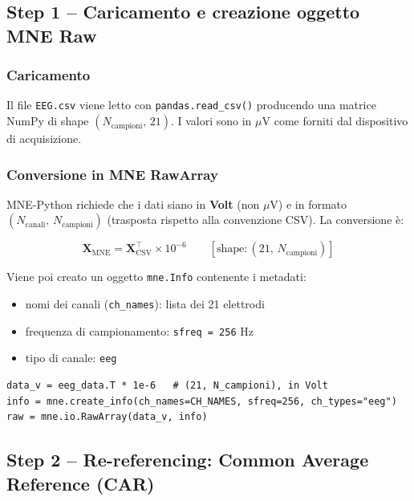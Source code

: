 \documentclass[12pt, a4paper]{article}
\begin{document}
\subsection{Step 1 -- Caricamento e creazione oggetto MNE Raw}

\subsubsection{Caricamento}
Il file \texttt{EEG.csv} viene letto con \texttt{pandas.read\_csv()} producendo una matrice NumPy di shape $(N_\text{campioni},\, 21)$. I valori sono in $\mu$V come forniti dal dispositivo di acquisizione.

\subsubsection{Conversione in MNE RawArray}
MNE-Python richiede che i dati siano in \textbf{Volt} (non $\mu$V) e in formato $(N_\text{canali},\, N_\text{campioni})$ (trasposta rispetto alla convenzione CSV). La conversione è:

\begin{formulabox}
\[
\mathbf{X}_\text{MNE} = \mathbf{X}_\text{CSV}^{\top} \times 10^{-6}
\qquad \left[\text{shape}: (21,\, N_\text{campioni})\right]
\]
\end{formulabox}

Viene poi creato un oggetto \texttt{mne.Info} contenente i metadati:
\begin{itemize}[noitemsep]
    \item nomi dei canali (\texttt{ch\_names}): lista dei 21 elettrodi
    \item frequenza di campionamento: \texttt{sfreq = 256} Hz
    \item tipo di canale: \texttt{eeg}
\end{itemize}

\begin{lstlisting}[caption={Creazione oggetto MNE Raw}]
data_v = eeg_data.T * 1e-6   # (21, N_campioni), in Volt
info = mne.create_info(ch_names=CH_NAMES, sfreq=256, ch_types="eeg")
raw = mne.io.RawArray(data_v, info)
\end{lstlisting}

\subsection{Step 2 -- Re-referencing: Common Average Reference (CAR)}
\end{document}
